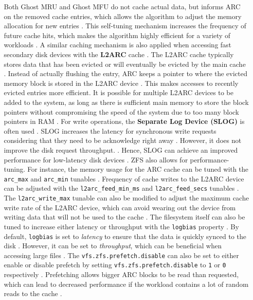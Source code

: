 Both Ghost MRU and Ghost MFU do not cache actual data, but informs ARC on the removed cache entries, which allows the algorithm
to adjust the memory allocation for new entries \parencite{khurshid2025}. This self-tuning mechanism increases the frequency of
future cache hits, which makes the algorithm highly efficient for a variety of workloads \parencite{khurshid2025}. A similar
caching mechanism is also applied when accessing fast secondary disk devices with the \textbf{L2ARC} cache \parencite{khurshid2025}.
The L2ARC cache typically stores data that has been evicted or will eventually be evicted by the main cache \parencite{khurshid2025}.
Instead of actually flushing the entry, ARC keeps a pointer to where the evicted memory block is stored in the L2ARC device
\parencite{khurshid2025}. This makes accesses to recently evicted entries more efficient. It is possible for multiple L2ARC devices
to be added to the system, as long as there is sufficient main memory to store the block pointers without compromising the speed
of the system due to too many block pointers in RAM \parencite{khurshid2025}. For write operations, the \textbf{Separate Log Device (SLOG)}
is often used \parencite{khurshid2025}. SLOG increases the latency for synchronous write requests considering that they need to
be acknowledge right away \parencite{khurshid2025}. However, it does not improve the disk request throughput. \parencite{khurshid2025}.
Hence, SLOG can achieve an improved performance for low-latency disk devices \parencite{khurshid2025}. ZFS also allows for
performance-tuning. For instance, the memory usage for the ARC cache can be tuned with the \texttt{arc\_max} and \texttt{arc\_min}
tunables \parencite{khurshid2025}. Frequency of cache writes to the L2ARC device can be adjusted with the \texttt{l2arc\_feed\_min\_ms}
and \texttt{l2arc\_feed\_secs} tunables \parencite{khurshid2025}. The \texttt{l2arc\_write\_max} tunable can also be modified to
adjust the maximum cache write rate of the L2ARC device, which can avoid wearing out the device from writing data that will
not be used to the cache \parencite{khurshid2025}. The filesystem itself can also be tuned to increase either latency or throughput
with the \texttt{logbias} property \parencite{lucas2015}. By default, \texttt{logbias} is set to \textit{latency} to ensure that the data
is quickly synced to the disk \parencite{lucas2015}. However, it can be set to \textit{throughput}, which can be beneficial when
accessing large files \parencite{lucas2015}. The \texttt{vfs.zfs.prefetch.disable} can also be set to either enable or disable
prefetch by setting \texttt{vfs.zfs.prefetch.disable} to \texttt{1} or \texttt{0} respectively \parencite{freebsd_zfs}. Prefetching
allows bigger ARC blocks to be read than requested, which can lead to decreased performance if the workload contains a lot of
random reads to the cache \parencite{freebsd_zfs}.

